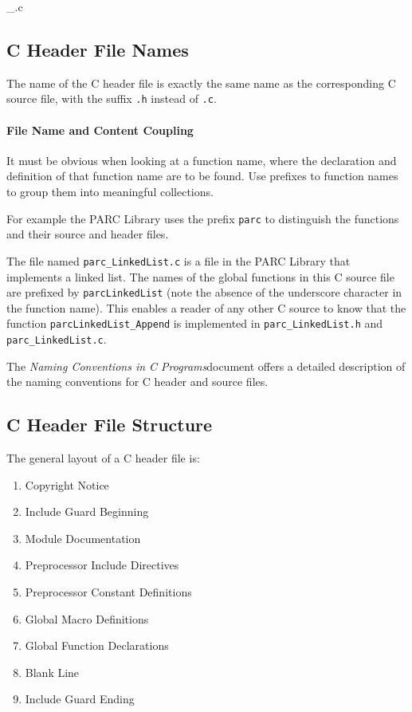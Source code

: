 \documentclass[fleqn,12pt]{PARCOneColumn} %
\begin{document}
\_.c

\subsection{C Header File Names}

The name of the C header file is exactly the same name as the corresponding C source file, with the suffix {\tt .h} instead of {\tt .c}.

\paragraph{File Name and Content Coupling}
It must be obvious when looking at a function name,
where the declaration and definition of that function name are to be found.
Use prefixes to function names to group them into meaningful collections.

For example the PARC Library uses the prefix {\tt parc} to distinguish the functions and their source and header files.

The file named {\tt parc\_LinkedList.c} is a file in the PARC Library that implements a linked list.
The names of the global functions in this C source file are prefixed by {\tt parcLinkedList}
(note the absence of the underscore character in the function name).
This enables a reader of any other C source to know that the function {\tt parcLinkedList\_Append} 
is implemented in {\tt parc\_LinkedList.h} and {\tt parc\_LinkedList.c}.

The \textit{Naming Conventions in C Programs}document offers a detailed description of the naming conventions for C header and source files.

\subsection{C Header File Structure}

The general layout of a C header file is:
\begin{enumerate}
\item Copyright Notice
\item Include Guard Beginning
\item Module Documentation
\item Preprocessor Include Directives
\item Preprocessor Constant Definitions
\item Global Macro Definitions
\item Global Function Declarations
\item Blank Line
\item Include Guard Ending
\end{enumerate}
\end{document}
